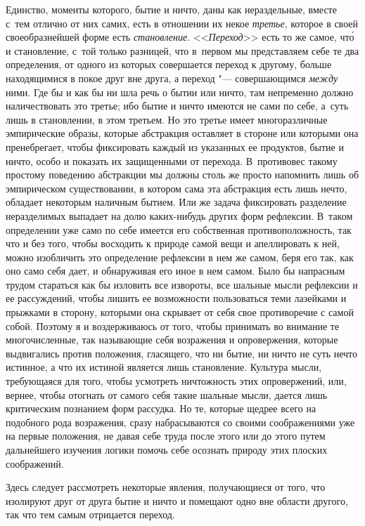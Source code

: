 Единство, моменты которого, бытие и ничто, даны как нераздельные, вместе с~тем
отлично от них самих, есть в отношении их некое {\em третье}, которое в своей
своеобразнейшей форме есть {\em становление}. <<{\em Переход}>> есть то же
самое, чт\'{о} и становление, с~той только разницей, что в~первом мы
представляем себе те два определения, от одного из которых совершается переход
к другому, больше находящимися в покое друг вне друга, а переход "---
совершающимся {\em между} ними. Где бы и как бы ни шла речь о бытии или ничто,
там непременно должно наличествовать это третье; ибо бытие и ничто имеются не
сами по себе, а~суть лишь в становлении, в этом третьем. Но это третье имеет
многоразличные эмпирические образы, которые абстракция оставляет в стороне или
которыми она пренебрегает, чтобы фиксировать каждый из указанных ее продуктов,
бытие и ничто, особо и показать их защищенными от перехода. В~противовес такому
простому поведению абстракции мы должны столь же просто напомнить лишь об
эмпирическом существовании, в котором сама эта абстракция есть лишь нечто,
обладает некоторым наличным бытием. Или же задача фиксировать разделение
неразделимых выпадает на долю каких-нибудь других форм рефлексии. В~таком
определении уже само по себе имеется его собственная противоположность, так что
и без того, чтобы восходить к природе самой вещи и апеллировать к ней, можно
изобличить это определение рефлексии в нем же самом, беря его так, как оно само
себя дает, и обнаруживая его иное в нем самом. Было бы напрасным трудом
стараться как бы изловить все извороты, все шальные мысли рефлексии и ее
рассуждений, чтобы лишить ее возможности пользоваться теми лазейками и прыжками
в сторону, которыми она скрывает от себя свое противоречие с самой собой.
Поэтому я и воздерживаюсь от того, чтобы принимать во внимание те
многочисленные, так называющие себя возражения и опровержения, которые
выдвигались против положения, гласящего, что ни бытие, ни ничто не суть нечто
истинное, а что их истиной является лишь становление. Культура мысли,
требующаяся для того, чтобы усмотреть ничтожность этих опровержений, или,
вернее, чтобы отогнать от самого себя такие шальные мысли, дается лишь
критическим познанием форм рассудка. Но те, которые щедрее всего на подобного
рода возражения, сразу набрасываются со своими соображениями уже на первые
положения, не давая себе труда после этого или до этого путем дальнейшего
изучения логики помочь себе осознать природу этих плоских соображений.

Здесь следует рассмотреть некоторые явления, получающиеся от того, что
изолируют друг от друга бытие и ничто и помещают одно вне области другого,
так что тем самым отрицается переход.

